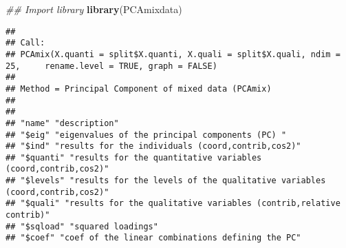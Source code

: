 \documentclass[
]{article}
\newenvironment{Shaded}{\begin{snugshade}}{\end{snugshade}}
\newcommand{\CommentTok}[1]{\textcolor[rgb]{0.56,0.35,0.01}{\textit{#1}}}
\newcommand{\DataTypeTok}[1]{\textcolor[rgb]{0.13,0.29,0.53}{#1}}
\newcommand{\DecValTok}[1]{\textcolor[rgb]{0.00,0.00,0.81}{#1}}
\newcommand{\KeywordTok}[1]{\textcolor[rgb]{0.13,0.29,0.53}{\textbf{#1}}}
\newcommand{\NormalTok}[1]{#1}
\newcommand{\OperatorTok}[1]{\textcolor[rgb]{0.81,0.36,0.00}{\textbf{#1}}}
\newcommand{\OtherTok}[1]{\textcolor[rgb]{0.56,0.35,0.01}{#1}}
\newcommand{\StringTok}[1]{\textcolor[rgb]{0.31,0.60,0.02}{#1}}
\begin{document}
\begin{Shaded}
\begin{Highlighting}[]
\CommentTok{## Import library}
\KeywordTok{library}\NormalTok{(PCAmixdata)}
\end{Highlighting}
\end{Shaded}

\begin{Shaded}
\end{Shaded}

\begin{verbatim}
## 
## Call:
## PCAmix(X.quanti = split$X.quanti, X.quali = split$X.quali, ndim = 25,     rename.level = TRUE, graph = FALSE)
## 
## Method = Principal Component of mixed data (PCAmix)
## 
## 
## "name" "description"
## "$eig" "eigenvalues of the principal components (PC) "
## "$ind" "results for the individuals (coord,contrib,cos2)"
## "$quanti" "results for the quantitative variables (coord,contrib,cos2)"
## "$levels" "results for the levels of the qualitative variables (coord,contrib,cos2)"
## "$quali" "results for the qualitative variables (contrib,relative contrib)"
## "$sqload" "squared loadings"
## "$coef" "coef of the linear combinations defining the PC"
\end{verbatim}

\begin{Shaded}
\end{Shaded}
\end{document}
